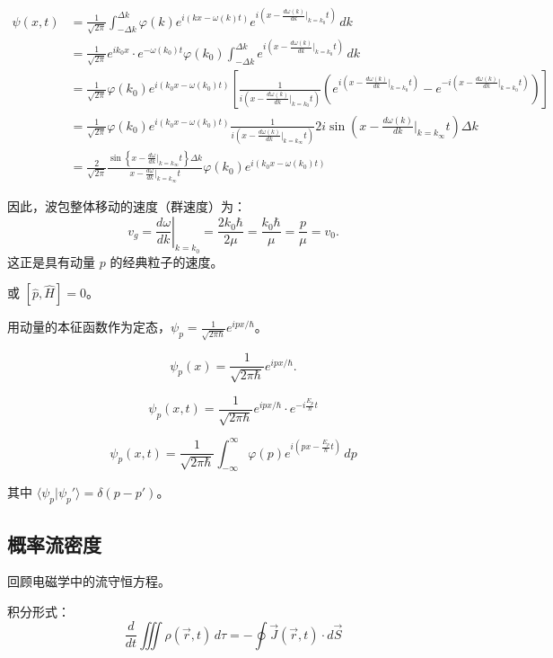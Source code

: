 \documentclass[lang=cn,10pt]{elegantbook}
\begin{document}
\begin{align*}
	\psi(x,t) &= \frac{1}{\sqrt{2\pi}} \int_{-\Delta k}^{\Delta k} \varphi(k) e^{i(kx - \omega(k)t)} e^{i\left(x - \frac{d\omega(k)}{dk}\bigg|_{k=k_0} t\right)} \, dk \\
	&= \frac{1}{\sqrt{2\pi}} e^{i k_0 x} \cdot e^{-\omega(k_0) t} \varphi(k_0) \int_{-\Delta k}^{\Delta k} e^{i\left(x - \frac{d\omega(k)}{dk}\bigg|_{k=k_0} t\right)} \, dk \\
	&= \frac{1}{\sqrt{2\pi}} \varphi(k_0) e^{i(k_0 x - \omega(k_0) t)} \left[ \frac{1}{i\left(x - \frac{d\omega(k)}{dk}\bigg|_{k=k_0} t\right)} \left( e^{i\left(x - \frac{d\omega(k)}{dk}\big|_{k=k_0} t\right)} - e^{-i\left(x - \frac{d\omega(k)}{dk}\big|_{k=k_0} t\right)} \right) \right] \\
	&= \frac{1}{\sqrt{2\pi}} \varphi(k_0) e^{i(k_0 x - \omega(k_0) t)} \frac{1}{i\left(x - \frac{d\omega(k)}{dk}\big|_{k=k_\infty} t\right)} 2i \sin\left(x - \frac{d\omega(k)}{dk}\big|_{k=k_\infty} t\right) \Delta k \\
	&= \frac{2}{\sqrt{2\pi}} \frac{\sin\left\{x - \frac{d\omega}{dk}\bigg|_{k=k_\infty} t\right\} \Delta k}{x - \frac{d\omega}{dk}\big|_{k=k_\infty} t}\varphi(k_0) e^{i(k_0 x - \omega(k_0) t)} 
\end{align*}

因此，波包整体移动的速度（群速度）为：
\[
v_g = \left. \frac{d\omega}{dk} \right|_{k=k_0} = \frac{2k_0 \hbar}{2\mu} = \frac{k_0 \hbar}{\mu} = \frac{p}{\mu} = v_0.
\]
这正是具有动量 \(p\) 的经典粒子的速度。

或 \([\hat{p}, \hat{H}] = 0\)。

用动量的本征函数作为定态，\(\psi_p = \frac{1}{\sqrt{2\pi\hbar}} e^{i p x/\hbar}\)。

\[
\psi_p(x) = \frac{1}{\sqrt{2\pi\hbar}} e^{i p x/\hbar}.
\]

\[
\psi_p(x,t) = \frac{1}{\sqrt{2\pi\hbar}} e^{i p x/\hbar} \cdot e^{-i \frac{E_p}{\hbar} t}
\]

\[
\psi_p(x,t) = \frac{1}{\sqrt{2\pi\hbar}} \int_{-\infty}^{\infty} \varphi(p) e^{i(p x - \frac{E_p}{\hbar} t)} \, dp
\]

其中 \(\langle \psi_p | \psi_p' \rangle = \delta(p - p')\)。
\subsection{概率流密度}
回顾电磁学中的流守恒方程。

积分形式：
\[
\frac{d}{dt} \iiint \rho(\vec{r},t) \, d\tau = - \oint \vec{J}(\vec{r},t) \cdot d\vec{S}
\]
\end{document}

